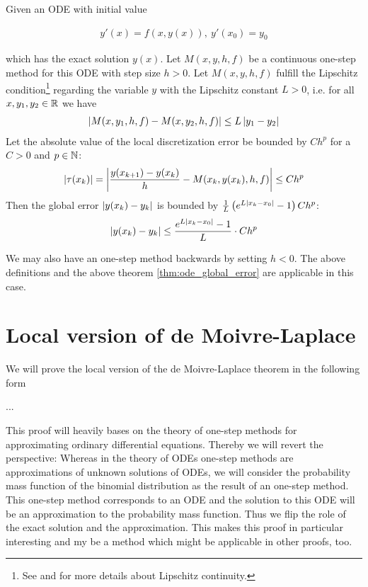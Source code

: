 \begin{theorem} \label{thm:ode_global_error}
  Given an ODE with initial value

  \begin{align}
    y'(x)=f(x,y(x)),\ y'(x_0)=y_0
  \end{align}

  which has the exact solution $y(x)$. Let $M(x,y,h,f)$ be a continuous one-step method for this ODE with step size $h > 0$. Let $M(x,y,h,f)$ fulfill the Lipschitz condition\footnote{See \cite[p. 467]{stoer} and \cite{wiki:lipschitz} for more details about Lipschitz continuity.} regarding the variable $y$ with the Lipschitz constant $L > 0$, i.e. for all $x,y_1,y_2\in\mathbb R$ we have
  \begin{align}
    \left|{M(x,y_1,h,f)-M(x,y_2,h,f)}\right| \le L \left|{y_1-y_2}\right|
  \end{align}
  Let the absolute value of the local discretization error be bounded by $C h^p$ for a $C > 0$ and $p\in \mathbb N$:
  \begin{align}
    \left|{\tau(x_k)}\right| = \left|{\frac{y(x_{k+1})-y(x_k)}h - M(x_k,y(x_k),h,f)}\right| \le Ch^p
  \end{align}
  Then the global error $\left|{y(x_k)-y_k}\right|$ is bounded by $\frac 1L \left( {e^{L\left|{x_k-x_0}\right|}-1} \right) C h^p$:
  \begin{align}
    \left|{y(x_k)-y_k}\right| \le \frac{e^{L\left|{x_k-x_0}\right|}-1}{L} \cdot Ch^p
  \end{align}
\end{theorem}

We may also have an one-step method backwards by setting $h < 0$. The above definitions and the  above theorem \ref{thm:ode_global_error} are applicable in this case.

\section{Local version of de Moivre-Laplace}

We will prove the local version of the de Moivre-Laplace theorem in the following form

\begin{theorem}
  ...
\end{theorem}

This proof will heavily bases on the theory of one-step methods for approximating ordinary differential equations. Thereby we will revert the perspective: Whereas in the theory of ODEs one-step methods are approximations of unknown solutions of ODEs, we will consider the probability mass function of the binomial distribution as the result of an one-step method. This one-step method corresponds to an ODE and the solution to this ODE will be an approximation to the probability mass function. Thus we flip the role of the exact solution and the approximation. This makes this proof in particular interesting and my be a method which might be applicable in other proofs, too.


